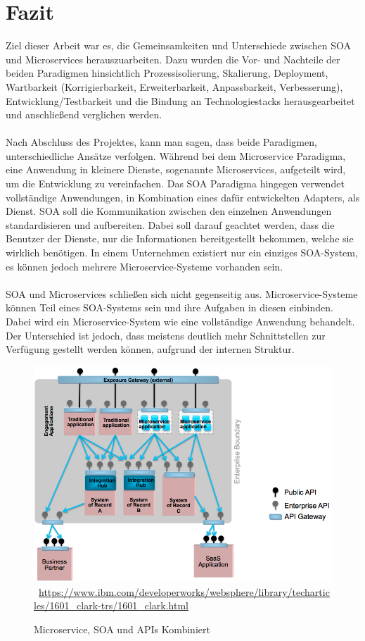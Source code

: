 \chapter{Fazit}
\label{chap:Fazit}
Ziel dieser Arbeit war es, die Gemeinsamkeiten und Unterschiede zwischen SOA und Microservices herauszuarbeiten. Dazu wurden die Vor- und Nachteile der beiden Paradigmen hinsichtlich Prozessisolierung, Skalierung, Deployment, Wartbarkeit (Korrigierbarkeit, Erweiterbarkeit, Anpassbarkeit, Verbesserung), Entwicklung/Testbarkeit und die Bindung an Technologiestacks herausgearbeitet und anschließend verglichen werden.
\\\\
Nach Abschluss des Projektes, kann man sagen, dass beide Paradigmen, unterschiedliche Ansätze verfolgen. Während bei dem Microservice Paradigma, eine Anwendung in kleinere Dienste, sogenannte Microservices, aufgeteilt wird, um die Entwicklung zu vereinfachen. Das SOA Paradigma hingegen verwendet vollständige Anwendungen, in Kombination eines dafür entwickelten Adapters, als Dienst. SOA soll die Kommunikation zwischen den einzelnen Anwendungen standardisieren und aufbereiten. Dabei soll darauf geachtet werden, dass die Benutzer der Dienste, nur die Informationen bereitgestellt bekommen, welche sie wirklich benötigen. In einem Unternehmen existiert nur ein einziges SOA-System, es können jedoch mehrere Microservice-Systeme vorhanden sein.
\\\\
SOA und Microservices schließen sich nicht gegenseitig aus. Microservice-Systeme können Teil eines SOA-Systems sein und ihre Aufgaben in diesen einbinden. Dabei wird ein Microservice-System wie eine vollständige Anwendung behandelt. Der  Unterschied ist jedoch, dass meistens deutlich mehr Schnittstellen zur Verfügung gestellt werden können, aufgrund der internen Struktur.
\begin{figure}[htb]
    \centering 
    \includegraphics[width=\textwidth]{content/images/figure8}\
    \quelle\url{https://www.ibm.com/developerworks/websphere/library/techarticles/1601_clark-trs/1601_clark.html}
    \caption{Microservice, SOA und APIs Kombiniert}
    \label{fig:MicroservicesSOAAndAPIsCombined} 
\end{figure}

